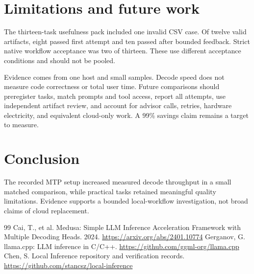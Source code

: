 \documentclass[11pt]{article}
\begin{document}
\section{Limitations and future work}
The thirteen-task usefulness pack included one invalid CSV case. Of twelve valid artifacts, eight passed first attempt and ten passed after bounded feedback. Strict native workflow acceptance was two of thirteen. These use different acceptance conditions and should not be pooled.\par
Evidence comes from one host and small samples. Decode speed does not measure code correctness or total user time. Future comparisons should preregister tasks, match prompts and tool access, report all attempts, use independent artifact review, and account for advisor calls, retries, hardware electricity, and equivalent cloud-only work. A 99\% savings claim remains a target to measure.\par
\section{Conclusion}
The recorded MTP setup increased measured decode throughput in a small matched comparison, while practical tasks retained meaningful quality limitations. Evidence supports a bounded local-workflow investigation, not broad claims of cloud replacement.\par
\begin{thebibliography}{99}
 Cai, T., et al. Medusa: Simple LLM Inference Acceleration Framework with Multiple Decoding Heads. 2024. \url{https://arxiv.org/abs/2401.10774}
 Gerganov, G. llama.cpp: LLM inference in C/C++. \url{https://github.com/ggml-org/llama.cpp}
 Chen, S. Local Inference repository and verification records. \url{https://github.com/stancsz/local-inference}
\end{thebibliography}
\end{document}
